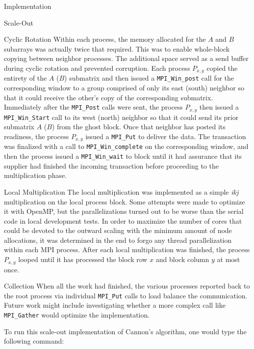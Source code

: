 \documentclass{article}
\begin{document}
\begin{section}{Implementation}
\begin{subsection}{Scale-Out}
\begin{paragraph}{Cyclic Rotation}
      Within each process, the memory allocated for the $A$ and $B$ subarrays was actually twice that required. This was to enable whole-block copying
      between neighbor processes. The additional space served as a send buffer during cyclic rotation and prevented corruption. Each process $P_{x,y}$
      copied the entirety of the $A$ ($B$) submatrix and then issued a \texttt{MPI\_Win\_post} call for the corresponding window to a group comprised of
      only its east (south) neighbor so that it could receive the other's copy of the corresponding submatrix. Immediately after the \texttt{MPI\_Post}
      calls were sent, the process $P_{x,y}$ then issued a \texttt{MPI\_Win\_Start} call to its west (north) neighbor so that it could send its prior submatrix
      $A$ ($B$) from the ghost block. Once that neighbor has posted its readiness, the process $P_{x,y}$ issued a \texttt{MPI\_Put} to deliver the data.
      The transaction was finalized with a call to \texttt{MPI\_Win\_complete} on the corresponding window, and then the process issued a \texttt{MPI\_Win\_wait}
      to block until it had assurance that its supplier had finished the incoming transaction before proceeding to the multiplication phase.
    \end{paragraph}
    \begin{paragraph}{Local Multiplication}
      The local multiplication was implemented as a simple \emph{ikj} multiplication on the local process block. Some attempts were made to optimize it
      with OpenMP, but the parallelizations turned out to be worse than the serial code in local development tests. In order to maximize the number
      of cores that could be devoted to the outward scaling with the minimum amount of node allocations, it was determined in the end to forgo any
      thread parallelization within each MPI process. After each local multiplication was finished, the process $P_{x,y}$ looped until it has processed
      the block row $x$ and block column $y$ at most once.
    \end{paragraph}
    \begin{paragraph}{Collection}
      When all the work had finished, the various processes reported back to the root process via individual \texttt{MPI\_Put} calls to load balance
      the communication. Future work might include investigating whether a more complex call like \texttt{MPI\_Gather} would optimize the implementation.
    \end{paragraph}
    \begin{paragraph}{}
      To run this scale-out implementation of Cannon's algorithm, one would type the following command:

\end{paragraph}
\end{subsection}
\end{section}
\end{document}
